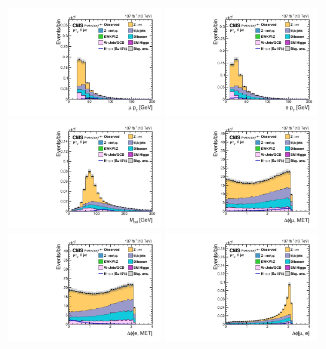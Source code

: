 \begin{figure}[htbp!]
  \centering
  \includegraphics[width=0.36\textwidth]{plots/chapter6/mue/mPt.pdf}
  \includegraphics[width=0.36\textwidth]{plots/chapter6/mue/ePt.pdf}\\
  \includegraphics[width=0.36\textwidth]{plots/chapter6/mue/m_e_CollMass.pdf}
  \includegraphics[width=0.36\textwidth]{plots/chapter6/mue/dPhiMuMET.pdf}\\
  \includegraphics[width=0.36\textwidth]{plots/chapter6/mue/dPhiEMET.pdf}
  \includegraphics[width=0.36\textwidth]{plots/chapter6/mue/dPhiMuE.pdf}\\

\end{figure}
